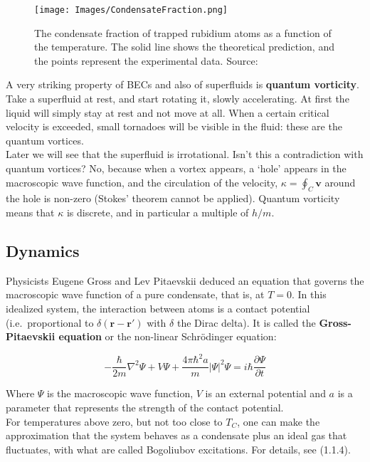 \documentclass{article}
\begin{document}
\begin{figure}[H]
    \centering
    \texttt{[image: Images/CondensateFraction.png]}
    \caption{The condensate fraction of trapped rubidium atoms as a function of the temperature.  The solid line shows the theoretical prediction, and the points represent the experimental data. Source: \cite{Ensher}}
    \label{fig:enter-label}
\end{figure}

A very striking property of BECs and also of superfluids is \textbf{quantum vorticity}.  Take a superfluid at rest, and start rotating it, slowly accelerating.  At first the liquid will simply stay at rest and not move at all. When a certain critical velocity is exceeded, small tornadoes will be visible in the fluid: these are the quantum vortices.
\\

Later we will see that the superfluid is irrotational.  Isn't this a contradiction with quantum vortices? No, because when a vortex appears, a `hole' appears in the macroscopic wave function, and the circulation of the velocity, $\kappa = \oint_C{\mathbf{v}}$ around the hole is non-zero (Stokes' theorem cannot be applied).  Quantum vorticity means that $\kappa$ is discrete, and in particular a multiple of $h/m$.

\subsection{Dynamics}

Physicists Eugene Gross and Lev Pitaevskii deduced an equation that governs the macroscopic wave function of a pure condensate, that is, at $T = 0$.  In this idealized system, the interaction between atoms is a contact potential (i.e.\ proportional to $\delta(\mathbf{r}-\mathbf{r}')$ with $\delta$ the Dirac delta). It is called the \textbf{Gross-Pitaevskii equation} or the non-linear Schrödinger equation:

\[-\frac{\hbar}{2m}\nabla^2\Psi+V\Psi+\frac{4\pi\hbar^2a}{m}|\Psi|^2\Psi=i\hbar \frac{\partial \Psi}{\partial t}\]

Where $\Psi$ is the macroscopic wave function, $V$ is an external potential and $a$ is a parameter that represents the strength of the contact potential.
\\

For temperatures above zero, but not too close to $T_C$, one can make the approximation that the system behaves as a condensate plus an ideal gas that fluctuates, with what are called Bogoliubov excitations.  For details, see \cite{Svistunov} (1.1.4).
\end{document}
